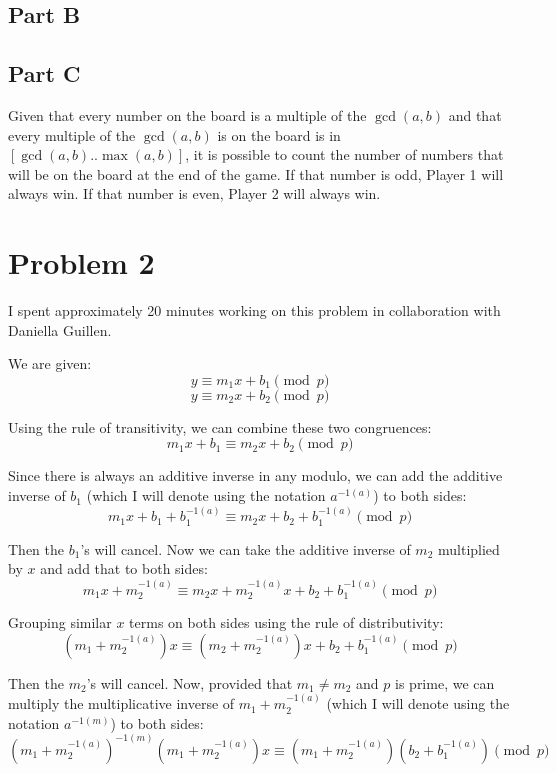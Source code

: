 \documentclass{article}
\begin{document}
\break

\subsection*{Part B}

\break

\subsection*{Part C}

Given that every number on the board is a multiple of the $\gcd(a, b)$ and that
every multiple of the $\gcd(a,b)$ is on the board is in $[\gcd(a,b) ..
\max(a,b)]$, it is possible to count the number of numbers that will be on the
board at the end of the game. If that number is odd, Player 1 will always win.
If that number is even, Player 2 will always win.

\break

\section*{Problem 2}

I spent approximately 20 minutes working on this problem in collaboration with
Daniella Guillen.

\bigbreak

We are given:
$$ y \equiv m_1 x + b_1 \pmod{p} $$
$$ y \equiv m_2 x + b_2 \pmod{p} $$

Using the rule of transitivity, we can combine these two congruences:
$$ m_1 x + b_1 \equiv m_2 x + b_2 \pmod{p} $$

Since there is always an additive inverse in any modulo, we can add the additive
inverse of $b_1$ (which I will denote using the notation $a^{-1(a)}$) to both
sides:
$$ m_1 x + b_1 + b_1^{-1(a)} \equiv m_2 x + b_2 + b_1^{-1(a)} \pmod{p} $$

Then the $b_1$'s will cancel. Now we can take the additive inverse of $m_2$
multiplied by $x$ and add that to both sides:
$$ m_1 x + m_2^{-1(a)} \equiv m_2 x + m_2^{-1(a)} x + b_2 + b_1^{-1(a)} \pmod{p}
$$

Grouping similar $x$ terms on both sides using the rule of distributivity:
$$ \left(m_1 + m_2^{-1(a)}\right) x \equiv \left(m_2 + m_2^{-1(a)}\right) x +
b_2 + b_1^{-1(a)} \pmod{p} $$

Then the $m_2$'s will cancel. Now, provided that $m_1 \neq m_2$ and $p$ is
prime, we can multiply the multiplicative inverse of $m_1 + m_2^{-1(a)}$ (which
I will denote using the notation $a^{-1(m)}$) to both sides:
$$ \left(m_1 + m_2^{-1(a)}\right)^{-1(m)} \left(m_1 + m_2^{-1(a)}\right) x
\equiv \left(m_1 + m_2^{-1(a)}\right) \left(b_2 + b_1^{-1(a)}\right) \pmod{p} $$
\end{document}
